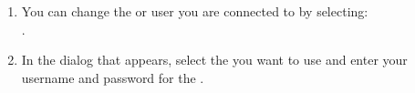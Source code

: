 \begin{enumerate}
\item You can change the \gddb{} or user you are connected to by selecting:\\
.
\item In the dialog that appears, select the \gddb{} you want to use and enter your username and password for the \gddb{}.
\end{enumerate}
